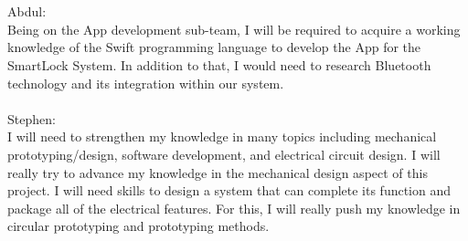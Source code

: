\documentclass[12pt]{article}
\begin{document}
\begin{enumerate}
  \\
\\
Abdul:
\\ 
 Being on the App development sub-team, I will be required to acquire a working knowledge of the Swift programming language to develop the App for the SmartLock System.  In addition to that, I would need to research Bluetooth technology and its integration within our system.
 \\
\\
Stephen:
\\
 I will need to strengthen my knowledge in many topics including mechanical prototyping/design, software development, and electrical circuit design.  I will really try to advance my knowledge in the mechanical design aspect of this project.  I will need skills to design a system that can complete its function and package all of the electrical features.  For this, I will really push my knowledge in circular prototyping and prototyping methods.
 

\end{enumerate}
\end{document}
